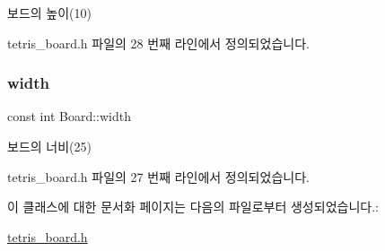 보드의 높이(10) 



tetris\+\_\+board.\+h 파일의 28 번째 라인에서 정의되었습니다.

\mbox{\label{class_board_a5c5b64d99e3c653c425206d2babf2f97}} 
\subsubsection{\texorpdfstring{width}{width}}
{\footnotesize\ttfamily const int Board\+::width\hspace{0.3cm}{\ttfamily [private]}}



보드의 너비(25) 



tetris\+\_\+board.\+h 파일의 27 번째 라인에서 정의되었습니다.



이 클래스에 대한 문서화 페이지는 다음의 파일로부터 생성되었습니다.\+:\begin{DoxyCompactItemize}
\item 
\mbox{\hyperlink{tetris__board_8h}{tetris\+\_\+board.\+h}}\end{DoxyCompactItemize}
